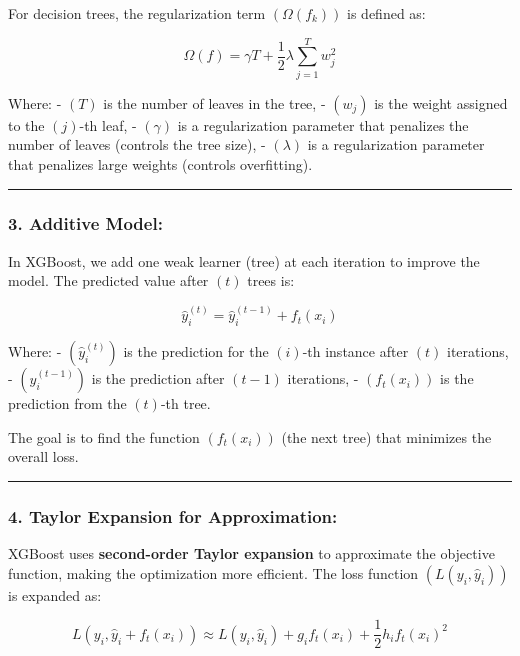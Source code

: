 \documentclass[12pt]{book}
\begin{document}
For decision trees, the regularization term \(( \Omega(f_k) )\) is
defined as:

\[
\Omega(f) = \gamma T + \frac{1}{2} \lambda \sum_{j=1}^{T} w_j^2
\]

Where: - \(( T )\) is the number of leaves in the tree, - \(( w_j )\) is
the weight assigned to the \(( j )\)-th leaf, - \(( \gamma )\) is a
regularization parameter that penalizes the number of leaves (controls
the tree size), - \(( \lambda )\) is a regularization parameter that
penalizes large weights (controls overfitting).

\begin{center}\rule{0.5\linewidth}{0.5pt}\end{center}

\subsubsection{\texorpdfstring{3. \textbf{Additive
Model:}}{3. Additive Model:}}\label{additive-model}

In XGBoost, we add one weak learner (tree) at each iteration to improve
the model. The predicted value after \(( t )\) trees is:

\[
\hat{y}_i^{(t)} = \hat{y}_i^{(t-1)} + f_t(x_i)
\]

Where: - \(( \hat{y}_i^{(t)} )\) is the prediction for the \(( i )\)-th
instance after \(( t )\) iterations, - \(( \hat{y}_i^{(t-1)} )\) is the
prediction after \(( t-1 )\) iterations, - \(( f_t(x_i) )\) is the
prediction from the \(( t )\)-th tree.

The goal is to find the function \(( f_t(x_i) )\) (the next tree) that
minimizes the overall loss.

\begin{center}\rule{0.5\linewidth}{0.5pt}\end{center}

\subsubsection{\texorpdfstring{4. \textbf{Taylor Expansion for
Approximation:}}{4. Taylor Expansion for Approximation:}}\label{taylor-expansion-for-approximation}

XGBoost uses \textbf{second-order Taylor expansion} to approximate the
objective function, making the optimization more efficient. The loss
function \(( L(y_i, \hat{y}_i) )\) is expanded as:

\[
L(y_i, \hat{y}_i + f_t(x_i)) \approx L(y_i, \hat{y}_i) + g_i f_t(x_i) + \frac{1}{2} h_i f_t(x_i)^2
\]
\end{document}
